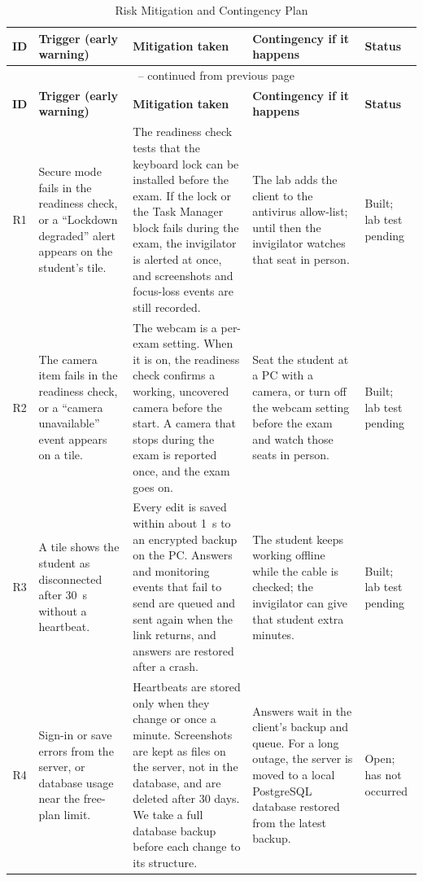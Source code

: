 {\footnotesize\setlength{\tabcolsep}{3pt}\renewcommand{\arraystretch}{1.15}
\begin{longtable}{@{}c>{\raggedright\arraybackslash}p{2.9cm}>{\raggedright\arraybackslash}p{5.2cm}>{\raggedright\arraybackslash}p{3.9cm}>{\raggedright\arraybackslash}p{1.8cm}@{}}
\caption{Risk Mitigation and Contingency Plan}\label{tab:risk_response}\\
\hline\hline
\textbf{ID} & \textbf{Trigger (early warning)} & \textbf{Mitigation taken} & \textbf{Contingency if it happens} & \textbf{Status} \\
\hline
\endfirsthead
\multicolumn{5}{c}{\tablename~\thetable{} -- continued from previous page}\\
\hline\hline
\textbf{ID} & \textbf{Trigger (early warning)} & \textbf{Mitigation taken} & \textbf{Contingency if it happens} & \textbf{Status} \\
\hline
\endhead
\hline\hline
\endlastfoot
R1 & Secure mode fails in the readiness check, or a ``Lockdown degraded'' alert appears on the student's tile. & The readiness check tests that the keyboard lock can be installed before the exam. If the lock or the Task Manager block fails during the exam, the invigilator is alerted at once, and screenshots and focus-loss events are still recorded. & The lab adds the client to the antivirus allow-list; until then the invigilator watches that seat in person. & Built; lab test pending \\
R2 & The camera item fails in the readiness check, or a ``camera unavailable'' event appears on a tile. & The webcam is a per-exam setting. When it is on, the readiness check confirms a working, uncovered camera before the start. A camera that stops during the exam is reported once, and the exam goes on. & Seat the student at a PC with a camera, or turn off the webcam setting before the exam and watch those seats in person. & Built; lab test pending \\
R3 & A tile shows the student as disconnected after 30~s without a heartbeat. & Every edit is saved within about 1~s to an encrypted backup on the PC. Answers and monitoring events that fail to send are queued and sent again when the link returns, and answers are restored after a crash. & The student keeps working offline while the cable is checked; the invigilator can give that student extra minutes. & Built; lab test pending \\
R4 & Sign-in or save errors from the server, or database usage near the free-plan limit. & Heartbeats are stored only when they change or once a minute. Screenshots are kept as files on the server, not in the database, and are deleted after 30 days. We take a full database backup before each change to its structure. & Answers wait in the client's backup and queue. For a long outage, the server is moved to a local PostgreSQL database restored from the latest backup. & Open; has not occurred \\

\end{longtable}}
